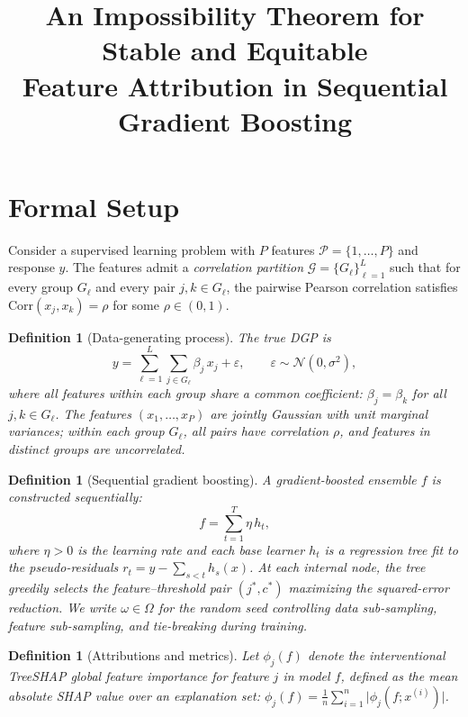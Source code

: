 \documentclass[11pt]{article}
\title{An Impossibility Theorem for Stable and Equitable\\
  Feature Attribution in Sequential Gradient Boosting}
\author{}
\date{}
\newtheorem{definition}[theorem]{Definition}
\theoremstyle{remark}
\newcommand{\feat}{\mathcal{P}}             %
\newcommand{\group}{\mathcal{G}}            %
\newcommand{\Gl}{G_\ell}                    %
\newcommand{\phij}{\phi_j}                  %
\newcommand{\totalT}{T}                     %
\newcommand{\rhovar}{\rho}                  %
\newcommand{\abs}[1]{\lvert #1 \rvert}
\begin{document}
\maketitle

\section{Formal Setup}
\label{sec:setup}

Consider a supervised learning problem with $P$ features
$\feat = \{1, \dots, P\}$ and response $y$.
The features admit a \emph{correlation partition}
$\group = \{\Gl\}_{\ell=1}^{L}$ such that for every group $\Gl$ and every
pair $j, k \in \Gl$, the pairwise Pearson correlation satisfies
$\mathrm{Corr}(x_j, x_k) = \rhovar$ for some $\rhovar \in (0, 1)$.

\begin{definition}[Data-generating process]
\label{def:dgp}
The true DGP is
\begin{equation}
  y = \sum_{\ell=1}^{L} \sum_{j \in \Gl} \beta_j\, x_j + \varepsilon,
  \qquad \varepsilon \sim \mathcal{N}(0, \sigma^2),
\end{equation}
where all features within each group share a common coefficient:
$\beta_j = \beta_k$ for all $j, k \in \Gl$.
The features $(x_1, \ldots, x_P)$ are jointly Gaussian with unit marginal
variances; within each group $\Gl$, all pairs have correlation $\rhovar$,
and features in distinct groups are uncorrelated.
\end{definition}

\begin{definition}[Sequential gradient boosting]
\label{def:sgb}
A gradient-boosted ensemble $f$ is constructed sequentially:
\begin{equation}
  f = \sum_{t=1}^{\totalT} \eta\, h_t,
\end{equation}
where $\eta > 0$ is the learning rate and each base learner $h_t$ is a
regression tree fit to the pseudo-residuals
$r_t = y - \sum_{s < t} h_s(x)$.
At each internal node, the tree greedily selects the feature--threshold pair
$(j^*, c^*)$ maximizing the squared-error reduction.
We write $\omega \in \Omega$ for the random seed controlling data
sub-sampling, feature sub-sampling, and tie-breaking during training.
\end{definition}

\begin{definition}[Attributions and metrics]
\label{def:attr}
Let $\phij(f)$ denote the interventional TreeSHAP global feature importance
for feature $j$ in model $f$, defined as the mean absolute SHAP value over
an explanation set:
$\phij(f) = \frac{1}{n} \sum_{i=1}^{n} \abs{\phi_j(f; x^{(i)})}$.
\end{definition}
\end{document}
